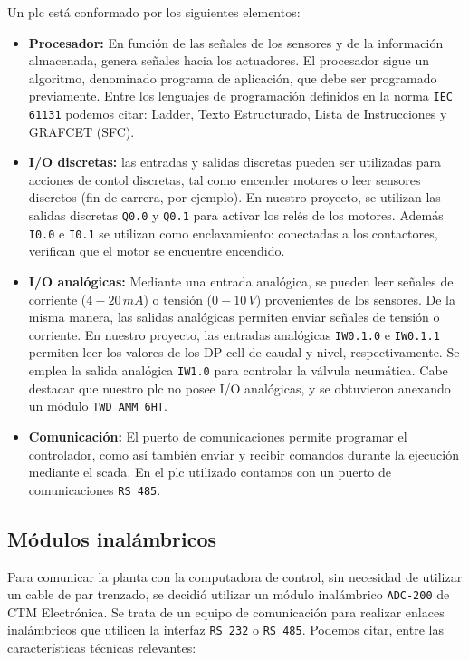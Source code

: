 Un \gls{plc} está conformado por los siguientes elementos:
\begin{itemize}
 \item \textbf{Procesador:} En función de las señales de los sensores y de la 
información almacenada, genera señales hacia los actuadores. El procesador 
sigue un algoritmo, denominado programa de aplicación, que debe ser programado 
previamente. Entre los lenguajes de programación definidos en la norma 
\verb|IEC 61131| podemos citar: Ladder, Texto Estructurado, Lista de 
Instrucciones y GRAFCET (SFC).
 \item \textbf{I/O discretas:} las entradas y salidas discretas pueden ser 
utilizadas para acciones de contol discretas, tal como encender motores o leer 
sensores discretos (fin de carrera, por ejemplo). En nuestro proyecto, se 
utilizan las salidas discretas \verb|Q0.0| y \verb|Q0.1| para activar los relés 
de los motores. Además \verb|I0.0| e \verb|I0.1| se utilizan como 
enclavamiento: conectadas a los contactores, verifican que el motor se 
encuentre encendido.
\item \textbf{I/O analógicas:} Mediante una entrada analógica, se pueden leer 
señales de corriente ($4-20\,mA$) o tensión ($0-10\,V$) provenientes de los 
sensores. De la misma manera, las salidas analógicas permiten enviar señales de 
tensión o corriente. En nuestro proyecto, las entradas analógicas \verb|IW0.1.0| e \verb|IW0.1.1| permiten leer los valores de los 
DP cell de caudal y nivel, respectivamente. Se emplea la salida analógica \verb|IW1.0| para controlar la válvula 
neumática. Cabe destacar que nuestro \gls{plc} 
no posee I/O analógicas, y se obtuvieron anexando un módulo \verb|TWD AMM 6HT|.
\item \textbf{Comunicación:} El puerto de comunicaciones permite programar el 
controlador, como así también enviar y recibir comandos durante la ejecución 
mediante el \gls{scada}. En el \gls{plc} utilizado contamos con un puerto de 
comunicaciones 
\verb|RS 485|.
\end{itemize}

\subsection{Módulos inalámbricos}
\label{subsec:inalambrico}

Para comunicar la planta con la computadora de control, sin necesidad de 
utilizar un cable de par trenzado, se decidió utilizar un módulo inalámbrico
\verb|ADC-200| de CTM Electrónica. Se trata de un equipo de comunicación para 
realizar enlaces inalámbricos que utilicen la interfaz \verb|RS 232| o 
\verb|RS 485|. Podemos citar, entre las características técnicas relevantes:

